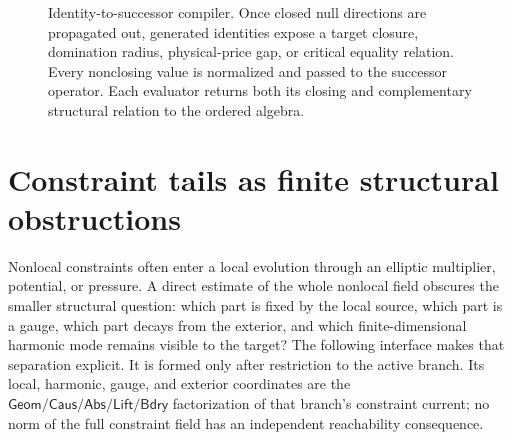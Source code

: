 \documentclass[11pt]{article}
\numberwithin{section}{part}
\theoremstyle{plain}
\theoremstyle{definition}
\theoremstyle{remark}
\newcommand{\Geom}{\mathsf{Geom}}
\newcommand{\Caus}{\mathsf{Caus}}
\newcommand{\Abs}{\mathsf{Abs}}
\newcommand{\Lift}{\mathsf{Lift}}
\newcommand{\Bdry}{\mathsf{Bdry}}
\begin{document}
\begin{figure}[tbp]
\centering
{}
\caption{Identity-to-successor compiler.  Once closed null directions are
propagated out, generated identities expose a target closure, domination
radius, physical-price gap, or critical equality relation.  Every nonclosing
value is normalized and passed to the successor operator.  Each evaluator returns both its closing and
complementary structural relation to the ordered algebra.}
\label{fig:estimate-invariant-compiler}
\end{figure}

\FloatBarrier

\section{Constraint tails as finite structural obstructions}
\label{sec:constraint-tails}

Nonlocal constraints often enter a local evolution through an elliptic
multiplier, potential, or pressure.  A direct estimate of the whole nonlocal
field obscures the smaller structural question: which part is fixed by the
local source, which part is a gauge, which part decays from the exterior, and
which finite-dimensional harmonic mode remains visible to the target?  The
following interface makes that separation explicit.
It is formed only after restriction to the active branch.  Its local,
harmonic, gauge, and exterior coordinates are the
\(\Geom/\Caus/\Abs/\Lift/\Bdry\) factorization of that branch's constraint
current; no norm of the full constraint field has an independent
reachability consequence.
\end{document}
